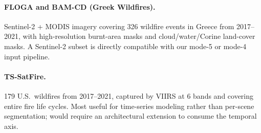 \documentclass{article}
\begin{document}
\paragraph{FLOGA and BAM-CD (Greek Wildfires).} Sentinel-2 + MODIS imagery covering 326 wildfire events in Greece from 2017--2021, with high-resolution burnt-area masks and cloud/water/Corine land-cover masks. A Sentinel-2 subset is directly compatible with our mode-5 or mode-4 input pipeline.

\paragraph{TS-SatFire.} 179 U.S.\ wildfires from 2017--2021, captured by VIIRS at 6 bands and covering entire fire life cycles. Most useful for time-series modeling rather than per-scene segmentation; would require an architectural extension to consume the temporal axis.


\end{document}
